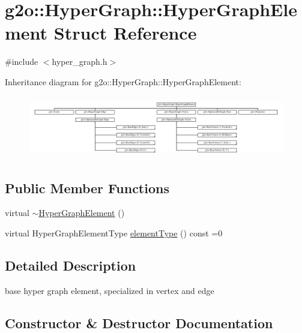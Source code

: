 \hypertarget{structg2o_1_1_hyper_graph_1_1_hyper_graph_element}{}\section{g2o\+:\+:Hyper\+Graph\+:\+:Hyper\+Graph\+Element Struct Reference}
\label{structg2o_1_1_hyper_graph_1_1_hyper_graph_element}


{\ttfamily \#include $<$hyper\+\_\+graph.\+h$>$}

Inheritance diagram for g2o\+:\+:Hyper\+Graph\+:\+:Hyper\+Graph\+Element\+:\begin{figure}[H]
\begin{center}
\leavevmode
\includegraphics[height=2.756681cm]{structg2o_1_1_hyper_graph_1_1_hyper_graph_element}
\end{center}
\end{figure}
\subsection*{Public Member Functions}
\begin{DoxyCompactItemize}
\item 
virtual \mbox{\hyperlink{structg2o_1_1_hyper_graph_1_1_hyper_graph_element_ab02c385ff2bd544037e2bef795761b2e}{$\sim$\+Hyper\+Graph\+Element}} ()
\item 
virtual Hyper\+Graph\+Element\+Type \mbox{\hyperlink{structg2o_1_1_hyper_graph_1_1_hyper_graph_element_a1a9d7b748698c09d202373e06e413ef2}{element\+Type}} () const =0
\end{DoxyCompactItemize}


\subsection{Detailed Description}
base hyper graph element, specialized in vertex and edge 

\subsection{Constructor \& Destructor Documentation}
\mbox{\label{structg2o_1_1_hyper_graph_1_1_hyper_graph_element_ab02c385ff2bd544037e2bef795761b2e}} 
